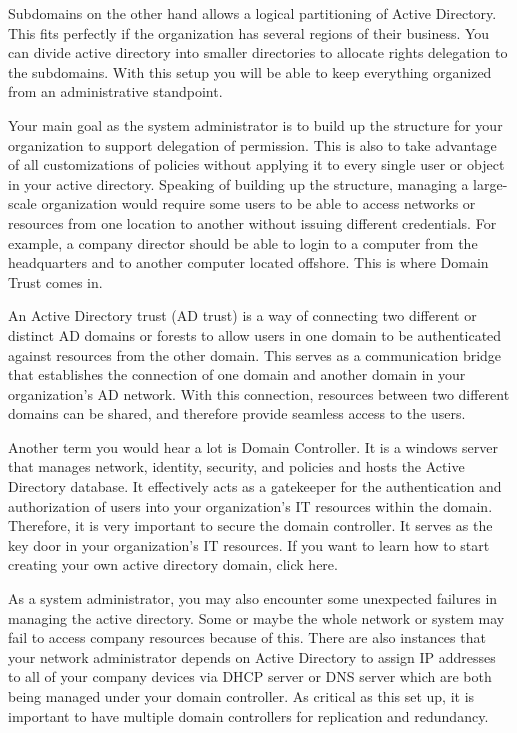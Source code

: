Subdomains on the other hand allows a logical partitioning of Active Directory. This fits perfectly if the organization has several regions of their business. You can divide active directory into smaller directories to allocate rights delegation to the subdomains. With this setup you will be able to keep everything organized from an administrative standpoint.

Your main goal as the system administrator is to build up the structure for your organization to support delegation of permission. This is also to take advantage of all customizations of policies without applying it to every single user or object in your active directory. Speaking of building up the structure, managing a large-scale organization would require some users to be able to access networks or resources from one location to another without issuing different credentials. For example, a company director should be able to login to a computer from the headquarters and to another computer located offshore. This is where Domain Trust comes in.

An Active Directory trust (AD trust) is a way of connecting two different or distinct AD domains or forests to allow users in one domain to be authenticated against resources from the other domain. This serves as a communication bridge that establishes the connection of one domain and another domain in your organization’s AD network. With this connection, resources between two different domains can be shared, and therefore provide seamless access to the users. 

Another term you would hear a lot is Domain Controller. It is a windows server that manages network, identity, security, and policies and hosts the Active Directory database. It effectively acts as a gatekeeper for the authentication and authorization of users into your organization’s IT resources within the domain. Therefore, it is very important to secure the domain controller. It serves as the key door in your organization’s IT resources. If you want to learn how to start creating your own active directory domain, click here. 

As a system administrator, you may also encounter some unexpected failures in managing the active directory. Some or maybe the whole network or system may fail to access company resources because of this. There are also instances that your network administrator depends on Active Directory to assign IP addresses to all of your company devices via DHCP server or DNS server which are both being managed under your domain controller. As critical as this set up, it is important to have multiple domain controllers for replication and redundancy. 

